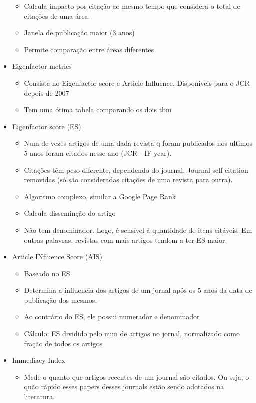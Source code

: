\documentclass[11pt]{article}
\begin{document}
\begin{itemize}
\begin{itemize}
\item Calcula impacto por citação ao mesmo tempo que considera o total de citações de uma área.
\item Janela de publicação maior (3 anos)
\item Permite comparação entre áreas diferentes
\end{itemize}
\item Eigenfactor metrics
\begin{itemize}
\item Consiste no Eigenfactor score e Article Influence. Disponiveis para o JCR depois de 2007
\item Tem uma ótima tabela comparando os dois tbm
\end{itemize}
\item Eigenfactor score (ES)
\begin{itemize}
\item Num de vezes artigos de uma dada revista q foram publicados nos ultimos 5 anos foram citados nesse ano (JCR - IF year).
\item Citações têm peso diferente, dependendo do journal. Journal self-citation removidas (só são consideradas citações de uma revista para outra).
\item Algoritmo complexo, similar a Google Page Rank
\item Calcula disseminção do artigo
\item Não tem denominador. Logo, é sensível à quantidade de itens citáveis. Em outras palavras, revistas com mais artigos tendem a ter ES maior.
\end{itemize}
\item Article INfluence Score (AIS)
\begin{itemize}
\item Baseado no ES
\item Determina a influencia dos artigos de um jornal após os 5 anos da data de publicação dos mesmos.
\item Ao contrário do ES, ele possui numerador e denominador
\item Cálculo: ES dividido pelo num de artigos no jornal, normalizado como fração de todos os artigos
\end{itemize}
\item Immediacy Index
\begin{itemize}
\item Mede o quanto que artigos recentes de um journal são citados. Ou seja, o quão rápido esses papers desses journals estão sendo adotados na literatura.
\end{itemize}
\end{itemize}
\end{document}
